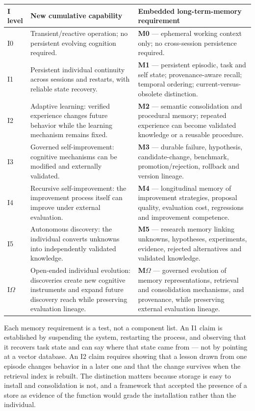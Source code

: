\documentclass[11pt]{article}
\theoremstyle{definition}
\newcommand{\Om}{\ensuremath{\Omega}}
\begin{document}
\begin{table}[h]
\centering\small
\begin{tabularx}{\textwidth}{@{}lYZ@{}}
\toprule
I level & New cumulative capability & Embedded long-term-memory requirement \\
\midrule
I0 & Transient/reactive operation; no persistent evolving cognition required. & \textbf{M0} --- ephemeral working context only; no cross-session persistence required. \\
I1 & Persistent individual continuity across sessions and restarts, with reliable state recovery. & \textbf{M1} --- persistent episodic, task and self state; provenance-aware recall; temporal ordering; current-versus-obsolete distinction. \\
I2 & Adaptive learning: verified experience changes future behavior while the learning mechanism remains fixed. & \textbf{M2} --- semantic consolidation and procedural memory; repeated experience can become validated knowledge or a reusable procedure. \\
I3 & Governed self-improvement: cognitive mechanisms can be modified and externally validated. & \textbf{M3} --- durable failure, hypothesis, candidate-change, benchmark, promotion/rejection, rollback and version lineage. \\
I4 & Recursive self-improvement: the improvement process itself can improve under external evaluation. & \textbf{M4} --- longitudinal memory of improvement strategies, proposal quality, evaluation cost, regressions and improvement competence. \\
I5 & Autonomous discovery: the individual converts unknowns into independently validated knowledge. & \textbf{M5} --- research memory linking unknowns, hypotheses, experiments, evidence, rejected alternatives and validated knowledge. \\
I\Om{} & Open-ended individual evolution: discoveries create new cognitive instruments and expand future discovery reach while preserving evaluation lineage. & \textbf{M\Om{}} --- governed evolution of memory representations, retrieval and consolidation mechanisms, and provenance, while preserving external evaluation lineage. \\
\bottomrule
\end{tabularx}
\end{table}

Each memory requirement is a test, not a component list. An I1 claim is established by suspending the system, restarting the process, and observing that it recovers task state and can say where that state came from --- not by pointing at a vector database. An I2 claim requires showing that a lesson drawn from one episode changes behavior in a later one and that the change survives when the retrieval index is rebuilt. The distinction matters because storage is easy to install and consolidation is not, and a framework that accepted the presence of a store as evidence of the function would grade the installation rather than the individual.
\end{document}
